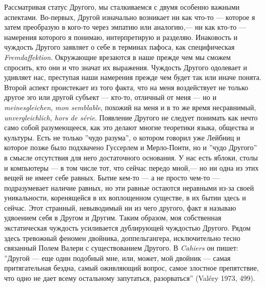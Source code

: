 \documentclass[12pt]{book}
\begin{document}
Рассматривая статус Другого, мы сталкиваемся с двумя особенно важными аспектами. Во-первых, Другой изначально возникает ни как что-то --- которое я затем преобразую в кого-то через эмпатию или аналогию,--- ни как кто-то --- намерения которого я понимаю, интерпретирую и разделяю. Инаковость и чуждость Другого заявляет о себе в терминах пафоса, как специфическая \textit{Fremdaffektion}. Окружающие врезаются в наше прежде чем мы сможем спросить, кто они и что значат их выражения. Чуждость Другого одолевает и удивляет нас, преступая наши намерения прежде чем будет так или иначе понята. Второй аспект проистекает из того факта, что на меня воздействует не только другое эго или другой субъект --- кто-то, отличный от меня --- но и \textit{meinesgleichen}, \textit{mon semblable}, похожий на меня и в то же время несравнимый, \textit{unvergleichlich, hors de série}. Появление Другого не следует понимать как нечто само собой разумеющееся, как это делают многие теоретики языка, общества и культуры. Есть не только ''чудо разума'', о котором говорил уже Лейбниц и которое позже было подхвачено Гуссерлем и Мерло-Понти, но и ''чудо Другого'' в смысле отсутствия для него достаточного основания. У нас есть яблоки, столы и компьютеры --- в том числе тот, что сейчас передо мной,--- но ни одна из этих вещей не имеет себе равных. Бытие кем-то --- а не просто чем-то --- подразумевает наличие равных, но эти равные остаются неравными из-за своей уникальности, коренящейся в их воплощенном существе, в их бытии здесь и сейчас. Этот странный, невыводимый ни из чего другого, факт я называю удвоением себя в Другом и Другим. Таким образом, моя собственная экстатическая чуждость усиливается дублирующей чуждостью Другого. Рядом здесь тревожный феномен двойника, доппельгангера, исключительно тесно связанный Полем Валери с существованием Другого. В \textit{Cahiers} он пишет: ''Другой --- еще один подобный мне, или, может, мой двойник --- самая притягательная бездна, самый оживляющий вопрос, самое злостное препятствие, что одно не дает всему остальному запутаться, разорваться'' (Valéry 1973, 499).
\end{document}
